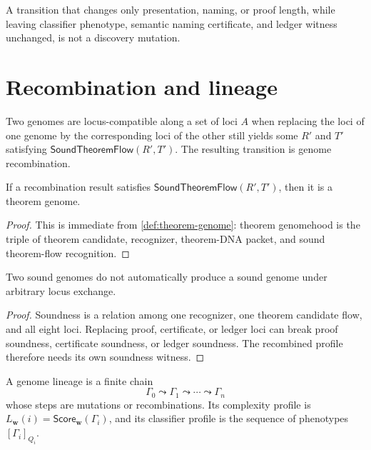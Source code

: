 \begin{principle}
\label{prin:theorem-genome-no-free-discovery}
A transition that changes only presentation, naming, or proof length, while
leaving classifier phenotype, semantic naming certificate, and ledger witness
unchanged, is not a discovery mutation.
\end{principle}

\section{Recombination and lineage}
\label{sec:theorem-genome-recombination-lineage}

\begin{definition}
\label{def:theorem-genome-recombination}
Two genomes are locus-compatible along a set of loci $A$ when replacing the
loci of one genome by the corresponding loci of the other still yields some
$R'$ and $T'$ satisfying $\mathsf{SoundTheoremFlow}(R',T')$. The resulting
transition is genome recombination.
\end{definition}

\begin{theorem}
\label{thm:theorem-genome-recombination-soundness}
If a recombination result satisfies $\mathsf{SoundTheoremFlow}(R',T')$, then
it is a theorem genome.
\end{theorem}
\begin{proof}
This is immediate from \autoref{def:theorem-genome}: theorem genomehood is the
triple of theorem candidate, recognizer, theorem-DNA packet, and sound
theorem-flow recognition.
\end{proof}

\begin{corollary}
\label{cor:theorem-genome-recombination-not-free}
Two sound genomes do not automatically produce a sound genome under arbitrary
locus exchange.
\end{corollary}
\begin{proof}
Soundness is a relation among one recognizer, one theorem candidate flow, and
all eight loci. Replacing proof, certificate, or ledger loci can break proof
soundness, certificate soundness, or ledger soundness. The recombined profile
therefore needs its own soundness witness.
\end{proof}

\begin{definition}
\label{def:theorem-genome-lineage}
A genome lineage is a finite chain
$$
\Gamma_0\leadsto\Gamma_1\leadsto\cdots\leadsto\Gamma_n
$$
whose steps are mutations or recombinations. Its complexity profile is
$L_{\mathbf w}(i)=\mathsf{Score}_{\mathbf w}(\Gamma_i)$, and its classifier
profile is the sequence of phenotypes $[\Gamma_i]_{Q_i}$.
\end{definition}

